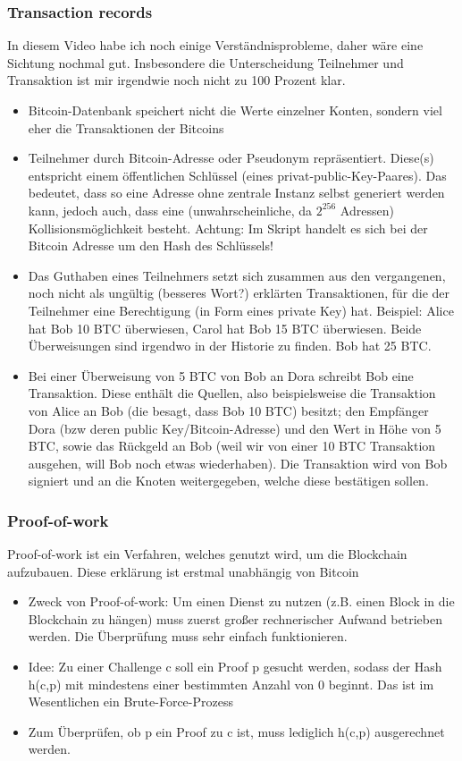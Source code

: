 \documentclass{article} %
\begin{document}
	\subsubsection{Transaction records}
	In diesem Video habe ich noch einige Verständnisprobleme, daher wäre eine Sichtung nochmal gut.
	Insbesondere die Unterscheidung Teilnehmer und Transaktion ist mir irgendwie noch nicht zu 100 Prozent klar.
	\begin{itemize}
		\item Bitcoin-Datenbank speichert nicht die Werte einzelner Konten, sondern viel eher die Transaktionen der Bitcoins
		\item Teilnehmer durch Bitcoin-Adresse oder Pseudonym repräsentiert. 
		Diese(s) entspricht einem öffentlichen Schlüssel (eines privat-public-Key-Paares).
		Das bedeutet, dass so eine Adresse ohne zentrale Instanz selbst generiert werden kann, jedoch auch, dass eine (unwahrscheinliche, da $2^256$ Adressen) Kollisionsmöglichkeit besteht.
		Achtung: Im Skript handelt es sich bei der Bitcoin Adresse um den Hash des Schlüssels!
		\item Das Guthaben eines Teilnehmers setzt sich zusammen aus den vergangenen, noch nicht als ungültig (besseres Wort?) erklärten Transaktionen, für die der Teilnehmer eine Berechtigung (in Form eines private Key) hat.
		Beispiel: Alice hat Bob 10 BTC überwiesen, Carol hat Bob 15 BTC überwiesen.
		Beide Überweisungen sind irgendwo in der Historie zu finden.
		Bob hat 25 BTC.
		\item Bei einer Überweisung von 5 BTC von Bob an Dora schreibt Bob eine Transaktion.
		Diese enthält die Quellen, also beispielsweise die Transaktion von Alice an Bob (die besagt, dass Bob 10 BTC) besitzt; den Empfänger Dora (bzw deren public Key/Bitcoin-Adresse) und den Wert in Höhe von 5 BTC, sowie das Rückgeld an Bob (weil wir von einer 10 BTC Transaktion ausgehen, will Bob noch etwas wiederhaben).
		Die Transaktion wird von Bob signiert und an die Knoten weitergegeben, welche diese bestätigen sollen.
	\end{itemize}
	\subsubsection{Proof-of-work}
	Proof-of-work ist ein Verfahren, welches genutzt wird, um die Blockchain aufzubauen.
	Diese erklärung ist erstmal unabhängig von Bitcoin
	\begin{itemize}
		\item Zweck von Proof-of-work: Um einen Dienst zu nutzen (z.B. einen Block in die Blockchain zu hängen) muss zuerst großer rechnerischer Aufwand betrieben werden.
		Die Überprüfung muss sehr einfach funktionieren.
		\item Idee: Zu einer Challenge c soll ein Proof p gesucht werden, sodass der Hash h(c,p) mit mindestens einer bestimmten Anzahl von 0 beginnt.
		Das ist im Wesentlichen ein Brute-Force-Prozess
		\item Zum Überprüfen, ob p ein Proof zu c ist, muss lediglich h(c,p) ausgerechnet werden.
	\end{itemize}
\end{document}
